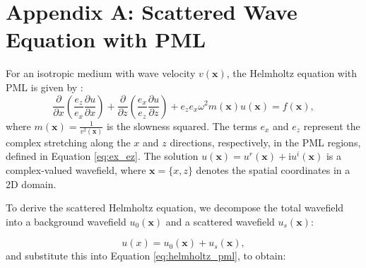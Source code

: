 \documentclass[authoryear, preprint, 12pt]{elsarticle}
\begin{document}
%	
%	
\appendix
\section*{Appendix A: Scattered Wave Equation with PML}
	\renewcommand{\theequation}{A.\arabic{equation}}
	\setcounter{equation}{0} %
	
	 For an isotropic medium with wave velocity $v(\mathbf{x})$, the Helmholtz equation with PML is given by \citep{berenger1994perfectly,chen2013optimal,song2022versatile}:
	\begin{equation}
		\frac{\partial}{\partial x}\left(\frac{e_z}{e_x} \frac{\partial u}{\partial x} \right)+ \frac{\partial}{\partial z}\left(\frac{e_x}{e_z} \frac{\partial u}{\partial z} \right)+ {e_z}{e_x} \omega^2 m(\mathbf{x}) u(\mathbf{x}) = f(\mathbf{x}),
		\label{eq:helmholtz_pml}
	\end{equation}
	where $m(\mathbf{x}) = \frac{1}{v^2(\mathbf{x})}$ is the slowness squared. The terms $e_x$ and $e_z$ represent the complex stretching along the $x$ and $z$ directions, respectively, in the PML regions, defined in Equation \ref{eq:ex_ez}. The solution $u(\mathbf{x}) = u^r(\mathbf{x}) + \mathrm{i} u^i(\mathbf{x})$ is a complex-valued wavefield, where $\mathbf{x} = \{x, z\}$ denotes the spatial coordinates in a 2D domain.
		
		To derive the scattered Helmholtz equation, we decompose the total wavefield into a background wavefield \( u_0(\mathbf{x}) \) and a scattered wavefield \( u_s(\mathbf{x}) \):
		
		\begin{equation*}
			u(x) = u_0(\mathbf{x}) + u_s(\mathbf{x}), 
		\end{equation*}
and substitute this into Equation \eqref{eq:helmholtz_pml}, to obtain:
		
\end{document}
